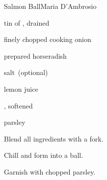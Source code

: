 \begin{recipe}{Salmon Ball}{Maria D'Ambrosio}{}

\begin{ingredients}
\item {} tin of , drained
\item {} finely chopped cooking onion
\item {} prepared horseradish
\item \tp{\quarter} salt~(optional)
\item {} lemon juice
\item {} , softened
\item parsley
\end{ingredients}

\begin{directions}
\item Blend all ingredients with a fork.
\item Chill and form into a ball.
\item Garnish with chopped parsley.
\end{directions}

\end{recipe}
